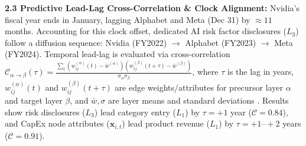 \documentclass[10pt,letterpaper,twocolumn]{article}
\begin{document}
\textbf{2.3 Predictive Lead-Lag Cross-Correlation \& Clock Alignment:} 
Nvidia's fiscal year ends in January, lagging Alphabet and Meta (Dec 31) by $\approx 11$ months. Accounting for this clock offset, dedicated AI risk factor disclosures ($L_3$) follow a diffusion sequence: Nvidia (FY2022) $\to$ Alphabet (FY2023) $\to$ Meta (FY2024). Temporal lead-lag is evaluated via cross-correlation $\mathcal{C}_{\alpha \to \beta}(\tau)=\frac{\sum_t (w_{ij}^{(\alpha)}(t) - \bar{w}^{(\alpha)})(w_{ij}^{(\beta)}(t+\tau) - \bar{w}^{(\beta)})}{\sigma_\alpha \sigma_\beta}$, where $\tau$ is the lag in years, $w_{ij}^{(\alpha)}(t)$ and $w_{ij}^{(\beta)}(t+\tau)$ are edge weights/attributes for precursor layer $\alpha$ and target layer $\beta$, and $\bar{w}, \sigma$ are layer means and standard deviations \cite{boccaletti2014,kivel2014}. Results show risk disclosures ($L_3$) lead category entry ($L_1$) by $\tau = +1$ year ($\mathcal{C} = 0.84$), and CapEx node attributes ($\mathbf{x}_{i,t}$) lead product revenue ($L_1$) by $\tau = +1\text{--}+2$ years ($\mathcal{C} = 0.91$).
\end{document}
